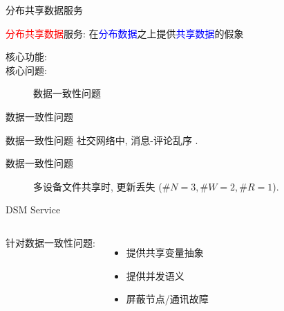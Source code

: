 \begin{frame}{分布共享数据服务}
  \begin{center}
    \textcolor{red}{分布共享数据}服务: 在\textcolor{blue}{分布数据}之上提供\textcolor{blue}{共享数据}的假象
  \end{center}
  
  \begin{description}
    \item[核心功能:] 
    \item[核心问题:] 数据一致性问题
  \end{description}
\end{frame}
\begin{frame}{数据一致性问题}
\end{frame}
\begin{frame}{数据一致性问题}
  {社交网络中, 消息-评论乱序 .}
\end{frame}
\begin{frame}{数据一致性问题}
  \begin{figure}[h!]
    \centering
    \begin{adjustbox}{max totalsize = {0.70\textwidth}{0.65\textheight}, center}
      
    \end{adjustbox}
    \caption{多设备文件共享时, 更新丢失 ($\#N = 3, \#W = 2, \#R = 1$).}
  \end{figure}
\end{frame}
\begin{frame}{DSM Service}
  \begin{columns}

      针对数据一致性问题:
      \begin{itemize}
	\item 提供共享变量抽象
	\item 提供并发语义
	\item 屏蔽节点/通讯故障
      \end{itemize}
  \end{columns}
\end{frame}
